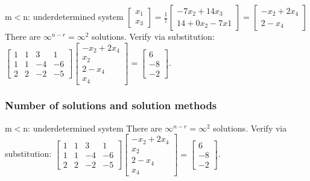 \begin{frame}
\begin{block}{m$<$n: underdetermined system}
		$\begin{bmatrix}
		x_1\\x_3
		\end{bmatrix}=\frac{1}{7}\begin{bmatrix}
		-7x_2+14x_3\\14+0x_2-7x1
		\end{bmatrix}=\begin{bmatrix}
		-x_2+2x_4\\2-x_4
		\end{bmatrix}$\\
		There are $\infty^{n-r}=\infty^2$ solutions. Verify via substitution: $\begin{bmatrix}
		1 & 1 & 3 & 1\\
		1 & 1 & -4 & -6\\
		2 & 2 & -2 & -5
		\end{bmatrix}\begin{bmatrix}
		-x_2+2x_4\\
		x_2\\
		2-x_4\\
		x_4
		\end{bmatrix}=\begin{bmatrix}
		6\\-8\\-2
		\end{bmatrix}$.
	\end{block}
\end{frame}

\begin{frame}
	\frametitle{Number of solutions and solution methods}
	\begin{block}{m$<$n: underdetermined system}
		There are $\infty^{n-r}=\infty^2$ solutions. Verify via substitution: $\begin{bmatrix}
		1 & 1 & 3 & 1\\
		1 & 1 & -4 & -6\\
		2 & 2 & -2 & -5
		\end{bmatrix}\begin{bmatrix}
		-x_2+2x_4\\
		x_2\\
		2-x_4\\
		x_4
		\end{bmatrix}=\begin{bmatrix}
		6\\-8\\-2
		\end{bmatrix}$.
	\end{block}
\end{frame}

